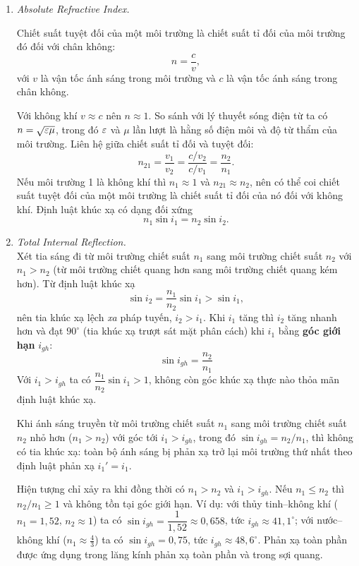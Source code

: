 \begin{enumerate}
\item \textit{Absolute Refractive Index.}\\
\begin{definition}
Chiết suất tuyệt đối của một môi trường là chiết suất tỉ đối của môi trường đó đối với chân không:
\[
n = \frac{c}{v},
\]
với $v$ là vận tốc ánh sáng trong môi trường và $c$ là vận tốc ánh sáng trong chân không.
\end{definition}
Với không khí $v \approx c$ nên $n \approx 1$. So sánh với lý thuyết sóng điện từ ta có $n = \sqrt{\varepsilon\mu}$, trong đó $\varepsilon$ và $\mu$ lần lượt là hằng số điện môi và độ từ thẩm của môi trường. Liên hệ giữa chiết suất tỉ đối và tuyệt đối:
\[
n_{21} = \frac{v_1}{v_2} = \frac{c/v_2}{c/v_1} = \frac{n_2}{n_1}.
\]
Nếu môi trường 1 là không khí thì $n_1 \approx 1$ và $n_{21} \approx n_2$, nên có thể coi chiết suất tuyệt đối của một môi trường là chiết suất tỉ đối của nó đối với không khí. Định luật khúc xạ có dạng đối xứng
\[
\boxed{n_1\sin i_1 = n_2\sin i_2}.
\]
\item \textit{Total Internal Reflection.}\\
Xét tia sáng đi từ môi trường chiết suất $n_1$ sang môi trường chiết suất $n_2$ với $n_1 > n_2$ (từ môi trường chiết quang hơn sang môi trường chiết quang kém hơn). Từ định luật khúc xạ
\[
\sin i_2 = \frac{n_1}{n_2}\sin i_1 > \sin i_1,
\]
nên tia khúc xạ lệch \textit{xa} pháp tuyến, $i_2 > i_1$. Khi $i_1$ tăng thì $i_2$ tăng nhanh hơn và đạt $90^\circ$ (tia khúc xạ trượt sát mặt phân cách) khi $i_1$ bằng \textbf{góc giới hạn} $i_{gh}$:
\[
\boxed{\sin i_{gh} = \frac{n_2}{n_1}}
\]
Với $i_1 > i_{gh}$ ta có $\dfrac{n_1}{n_2}\sin i_1 > 1$, không còn góc khúc xạ thực nào thỏa mãn định luật khúc xạ.
\begin{theorem}
Khi ánh sáng truyền từ môi trường chiết suất $n_1$ sang môi trường chiết suất $n_2$ nhỏ hơn ($n_1 > n_2$) với góc tới $i_1 > i_{gh}$, trong đó $\sin i_{gh} = n_2/n_1$, thì không có tia khúc xạ: toàn bộ ánh sáng bị phản xạ trở lại môi trường thứ nhất theo định luật phản xạ $i_1' = i_1$.
\end{theorem}
Hiện tượng chỉ xảy ra khi đồng thời có $n_1 > n_2$ và $i_1 > i_{gh}$. Nếu $n_1 \leq n_2$ thì $n_2/n_1 \geq 1$ và không tồn tại góc giới hạn. Ví dụ: với thủy tinh--không khí ($n_1 = 1{,}52$, $n_2 \approx 1$) ta có $\sin i_{gh} = \dfrac{1}{1{,}52} \approx 0{,}658$, tức $i_{gh} \approx 41{,}1^\circ$; với nước--không khí ($n_1 \approx \tfrac43$) ta có $\sin i_{gh} = 0{,}75$, tức $i_{gh} \approx 48{,}6^\circ$. Phản xạ toàn phần được ứng dụng trong lăng kính phản xạ toàn phần và trong sợi quang.
\end{enumerate}

